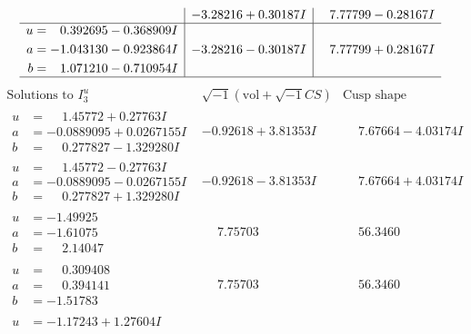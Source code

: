 \documentclass[1p]{elsarticle_modified}
\theoremstyle{definition}
\newcommand{\I}{\sqrt{-1}}
\begin{document}
$$\begin{array}{c|c|c}
 & -3.28216 + 0.30187 I & \phantom{-}7.77799 - 0.28167 I \\ \hline\begin{aligned}
u &= \phantom{-}0.392695 - 0.368909 I \\
a &= -1.043130 - 0.923864 I \\
b &= \phantom{-}1.071210 - 0.710954 I\end{aligned}
 & -3.28216 - 0.30187 I & \phantom{-}7.77799 + 0.28167 I\\
 \hline 
 \end{array}$$\newpage$$\begin{array}{c|c|c}  
\text{Solutions to }I^u_{3}& \I (\text{vol} + \sqrt{-1}CS) & \text{Cusp shape}\\
 \hline 
\begin{aligned}
u &= \phantom{-}1.45772 + 0.27763 I \\
a &= -0.0889095 + 0.0267155 I \\
b &= \phantom{-}0.277827 - 1.329280 I\end{aligned}
 & -0.92618 + 3.81353 I & \phantom{-}7.67664 - 4.03174 I \\ \hline\begin{aligned}
u &= \phantom{-}1.45772 - 0.27763 I \\
a &= -0.0889095 - 0.0267155 I \\
b &= \phantom{-}0.277827 + 1.329280 I\end{aligned}
 & -0.92618 - 3.81353 I & \phantom{-}7.67664 + 4.03174 I \\ \hline\begin{aligned}
u &= -1.49925\phantom{ +0.000000I} \\
a &= -1.61075\phantom{ +0.000000I} \\
b &= \phantom{-}2.14047\phantom{ +0.000000I}\end{aligned}
 & \phantom{-}7.75703\phantom{ +0.000000I} & \phantom{-}56.3460\phantom{ +0.000000I} \\ \hline\begin{aligned}
u &= \phantom{-}0.309408\phantom{ +0.000000I} \\
a &= \phantom{-}0.394141\phantom{ +0.000000I} \\
b &= -1.51783\phantom{ +0.000000I}\end{aligned}
 & \phantom{-}7.75703\phantom{ +0.000000I} & \phantom{-}56.3460\phantom{ +0.000000I} \\ \hline\begin{aligned}
u &= -1.17243 + 1.27604 I \\

\end{aligned}
\end{array}$$
\end{document}

